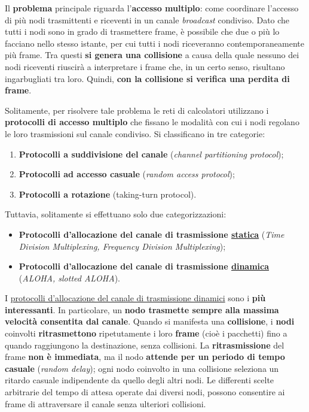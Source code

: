 \documentclass[a4paper]{article}
\begin{document}
	\noindent
	Il \textcolor{Red3}{\textbf{problema}} principale riguarda l'\textcolor{Red3}{\textbf{accesso multiplo}}: come coordinare l'accesso di più nodi trasmittenti e riceventi in un canale \emph{broadcast} condiviso.\newline
	Dato che tutti i nodi sono in grado di trasmettere frame, è possibile che due o più lo facciano nello stesso istante, per cui tutti i nodi riceveranno contemporaneamente più frame. Tra questi \textbf{si genera una collisione} a causa della quale nessuno dei nodi riceventi riuscirà a interpretare i frame che, in un certo senso, risultano ingarbugliati tra loro. Quindi, \textbf{con la collisione si verifica una perdita di frame}.\newline
	
	\noindent
	Solitamente, per risolvere tale problema le reti di calcolatori utilizzano i \textbf{protocolli di accesso multiplo} che fissano le modalità con cui i nodi regolano le loro trasmissioni sul canale condiviso. Si classificano in tre categorie:
	\begin{enumerate}
		\item \textbf{Protocolli a suddivisione del canale} (\emph{channel partitioning protocol});
		\item \textbf{Protocolli ad accesso casuale} (\emph{random access protocol});
		\item \textbf{Protocolli a rotazione} (taking-turn protocol).
	\end{enumerate}
	Tuttavia, solitamente si effettuano solo due categorizzazioni:
	\begin{itemize}
		\item \textbf{Protocolli d'allocazione del canale di trasmissione \underline{statica}} (\emph{Time Division Multiplexing, Frequency Division Multiplexing});
		\item \textbf{Protocolli d'allocazione del canale di trasmissione \underline{dinamica}} (\emph{ALOHA, slotted ALOHA}).
	\end{itemize}
	I \underline{protocolli d’allocazione del canale di trasmissione dinamici} sono i \textbf{più interessanti}. In particolare, un \textbf{nodo trasmette sempre alla massima velocità consentita dal canale}. Quando si manifesta una \textbf{collisione}, i \textbf{nodi} coinvolti \textbf{ritrasmettono} ripetutamente i loro \textbf{frame} (cioè i pacchetti) fino a quando raggiungono la destinazione, senza collisioni. La \textbf{ritrasmissione} del frame \textbf{non è immediata}, ma il nodo \textbf{attende per un periodo di tempo casuale} (\emph{random delay}); ogni nodo coinvolto in una collisione seleziona un ritardo casuale indipendente da quello degli altri nodi. Le differenti scelte arbitrarie del tempo di attesa operate dai diversi nodi, possono consentire ai frame di attraversare il canale senza ulteriori collisioni.
	
\end{document}
